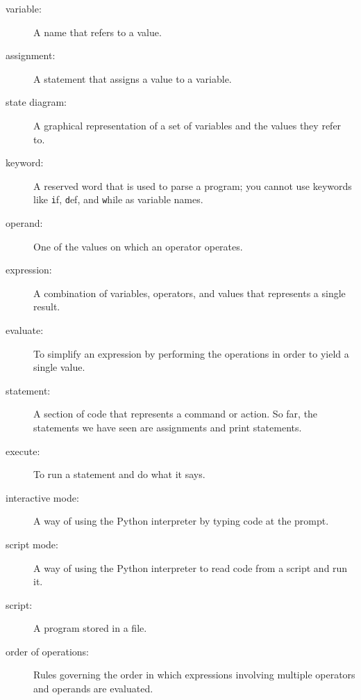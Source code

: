 \documentclass[
DIV=11,
fontsize=13,
twoside,
headinclude=false,
titlepage=firstiscover,
abstract=true,
headsepline=true,
footsepline=true,
chapterprefix=true, %
headings=big,
bibliography=totoc,%
captions=tableheading
]{scrbook}
\theoremstyle{definition}
\begin{document}
\begin{description}

\item[variable:]  A name that refers to a value.

\item[assignment:]  A statement that assigns a value to a variable.

\item[state diagram:]  A graphical representation of a set of variables and the
values they refer to.

\item[keyword:]  A reserved word that is used to parse a
program; you cannot use keywords like {\texttt if}, {\texttt  def}, and {\texttt while} as
variable names.

\item[operand:]  One of the values on which an operator operates.

\item[expression:]  A combination of variables, operators, and values that
represents a single result.

\item[evaluate:]  To simplify an expression by performing the operations
in order to yield a single value.

\item[statement:]  A section of code that represents a command or action.  So
far, the statements we have seen are assignments and print statements.

\item[execute:]  To run a statement and do what it says.

\item[interactive mode:] A way of using the Python interpreter by
typing code at the prompt.

\item[script mode:] A way of using the Python interpreter to read
code from a script and run it.

\item[script:] A program stored in a file.

\item[order of operations:]  Rules governing the order in which
expressions involving multiple operators and operands are evaluated.


\end{description}
\end{document}
